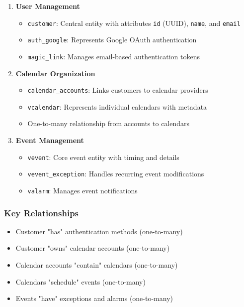 \begin{enumerate}
    \item \textbf{User Management}
          \begin{itemize}
              \item \texttt{customer}: Central entity with attributes \texttt{id} (UUID), \texttt{name}, and \texttt{email}
              \item \texttt{auth\_google}: Represents Google OAuth authentication
              \item \texttt{magic\_link}: Manages email-based authentication tokens
          \end{itemize}

    \item \textbf{Calendar Organization}
          \begin{itemize}
              \item \texttt{calendar\_accounts}: Links customers to calendar providers
              \item \texttt{vcalendar}: Represents individual calendars with metadata
              \item One-to-many relationship from accounts to calendars
          \end{itemize}

    \item \textbf{Event Management}
          \begin{itemize}
              \item \texttt{vevent}: Core event entity with timing and details
              \item \texttt{vevent\_exception}: Handles recurring event modifications
              \item \texttt{valarm}: Manages event notifications
          \end{itemize}
\end{enumerate}

\subsubsection{Key Relationships}

\begin{itemize}
    \item Customer "has" authentication methods (one-to-many)
    \item Customer "owns" calendar accounts (one-to-many)
    \item Calendar accounts "contain" calendars (one-to-many)
    \item Calendars "schedule" events (one-to-many)
    \item Events "have" exceptions and alarms (one-to-many)
\end{itemize}

